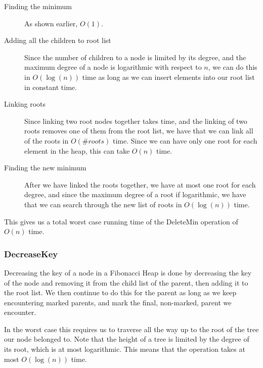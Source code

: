 \begin{description}
\item[Finding the minimum] As shown earlier, $O(1)$.
\item[Adding all the children to root list] Since the number of children to a node is limited by its degree, and the maximum degree of a node is logarithmic with respect to $n$, we can do this in $O(\log (n))$ time as long as we can insert elements into our root list in constant time.
\item[Linking roots] Since linking two root nodes together takes time, and the linking of two roots removes one of them from the root list, we have that we can link all of the roots in $O(\#roots)$ time. Since we can have only one root for each element in the heap, this can take $O(n)$ time.
\item[Finding the new minimum] After we have linked the roots together, we have at most one root for each degree, and since the maximum degree of a root if logarithmic, we have that we can search through the new list of roots in $O(\log (n))$ time.
\end{description}

This gives us a total worst case running time of the DeleteMin operation of $O(n)$ time.

\subsubsection{DecreaseKey}
Decreasing the key of a node in a Fibonacci Heap is done by decreasing the key of the node and removing it from the child list of the parent, then adding it to the root list. We then continue to do this for the parent as long as we keep encountering marked parents, and mark the final, non-marked, parent we encounter.

In the worst case this requires us to traverse all the way up to the root of the tree our node belonged to. Note that the height of a tree is limited by the degree of its root, which is at most logarithmic. This means that the operation takes at most $O(\log (n))$ time.